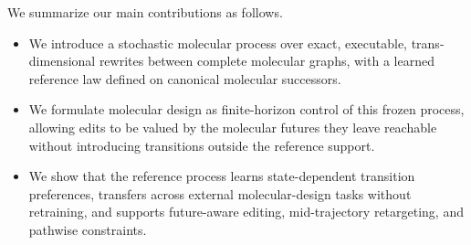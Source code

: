 We summarize our main contributions as follows.
\begin{itemize}[leftmargin=1.5em,itemsep=2pt,topsep=3pt,parsep=0pt]
\item We introduce a stochastic molecular process over exact, executable,
trans-dimensional rewrites between complete molecular graphs, with a learned
reference law defined on canonical molecular successors.
\item We formulate molecular design as finite-horizon control of this frozen
process, allowing edits to be valued by the molecular futures they leave
reachable without introducing transitions outside the reference support.
\item We show that the reference process learns state-dependent transition
preferences, transfers across external molecular-design tasks without
retraining, and supports future-aware editing, mid-trajectory retargeting, and
pathwise constraints.
\end{itemize}
